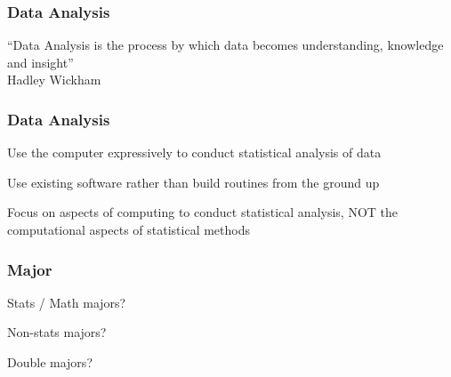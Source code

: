 \documentclass[12pt]{beamer}\usepackage[]{graphicx}\usepackage[]{color}
\begin{document}

\begin{frame}
\begin{center}
\Huge{}

\pause
\bigskip
\Huge{}

\end{center}
\end{frame}


\begin{frame}
\frametitle{Data Analysis}

\Large ``Data Analysis is the process by which data becomes understanding, knowledge and insight'' \\
{\lit \small{Hadley Wickham}}

\end{frame}


\begin{frame}
\frametitle{Data Analysis}

\bi
  \item Use the computer expressively to conduct statistical analysis of data
  \item Use existing software rather than build routines from the ground up
  \item Focus on aspects of computing to conduct statistical analysis, NOT the computational aspects of statistical methods
\ei

\end{frame}


\begin{frame}
\begin{center}
\Huge{}
\end{center}
\end{frame}


\begin{frame}
\frametitle{Major}

\bbi
 \item Stats / Math majors?
 \item Non-stats majors?
 \item Double majors?
\ei
\eb

\end{frame}
\end{document}
